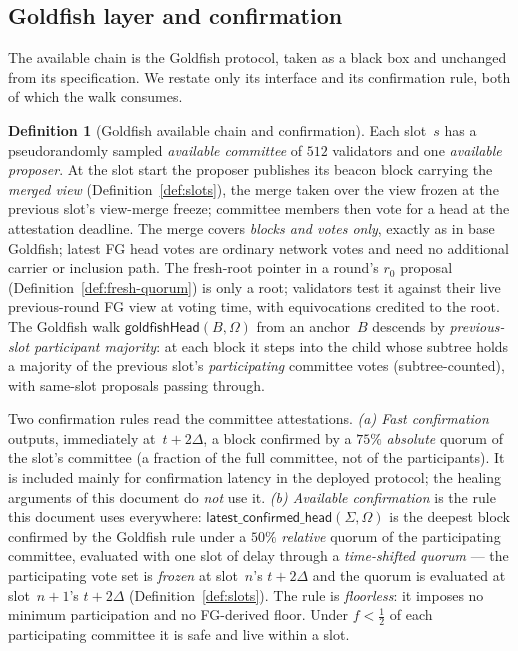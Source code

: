 \ifx\litemode\undefined\documentclass{article}\fi
\newcommand{\rzero}{\ensuremath{r_{0}}}                 %
\newcommand{\latestConfirmed}{\textsf{latest\_confirmed\_head}\xspace}
\theoremstyle{plain}
\theoremstyle{definition}
\newtheorem{definition}{Definition}
\theoremstyle{remark}
\begin{document}
\subsection{Goldfish layer and confirmation}\label{sec:goldfish}

The available chain is the Goldfish protocol, taken as a black box and
unchanged from its specification.  We restate only its interface and its
confirmation rule, both of which the walk consumes.

\begin{definition}[Goldfish available chain and confirmation]\label{def:goldfish-confirm}
Each slot~$s$ has a pseudorandomly sampled \emph{available committee} of
$512$ validators and one \emph{available proposer}.  At the slot start the
proposer publishes its beacon block carrying the \emph{merged view}
(Definition~\ref{def:slots}), the merge taken over the view frozen at the
previous slot's view-merge freeze; committee members then vote for a head at
the attestation deadline.
The merge covers \emph{blocks and votes only}, exactly as in base Goldfish;
latest FG head votes are ordinary network votes and need no additional carrier
or inclusion path.  The fresh-root pointer in a round's $\rzero$ proposal
(Definition~\ref{def:fresh-quorum}) is only a root; validators test it against
their live previous-round FG view at voting time, with equivocations credited
to the root.
The Goldfish walk $\textsf{goldfishHead}(B, \Omega)$ from an anchor~$B$
descends by \emph{previous-slot participant majority}: at each block it
steps into the child whose subtree holds a majority of the previous slot's
\emph{participating} committee votes (subtree-counted), with same-slot
proposals passing through.

Two confirmation rules read the committee attestations.
\emph{(a) Fast confirmation} outputs, immediately at~$t+2\Delta$, a block
confirmed by a $75\%$ \emph{absolute} quorum of the slot's committee (a
fraction of the full committee, not of the participants).  It is included
mainly for confirmation latency in the deployed protocol; the healing arguments
of this document do \emph{not} use it.
\emph{(b) Available confirmation} is the rule this document uses everywhere:
$\latestConfirmed(\Sigma, \Omega)$ is the deepest block confirmed by the
Goldfish rule under a $50\%$ \emph{relative} quorum of the participating
committee, evaluated with one slot of delay through a \emph{time-shifted
quorum} --- the participating vote set is \emph{frozen} at slot~$n$'s
$t+2\Delta$ and the quorum is evaluated at slot~$n+1$'s $t+2\Delta$
(Definition~\ref{def:slots}).  The rule is \emph{floorless}: it imposes no
minimum participation and no FG-derived floor.  Under $f < \tfrac12$ of each
participating committee it is safe and live within a slot.


\end{definition}
\end{document}
